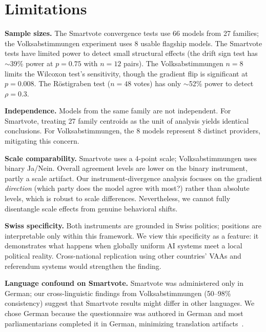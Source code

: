 \documentclass[11pt]{article}
\begin{document}
\section*{Limitations}

\textbf{Sample sizes.}
The Smartvote convergence tests use 66 models from 27 families; the Volksabstimmungen experiment uses 8 usable flagship models.
The Smartvote tests have limited power to detect small structural effects (the drift sign test has $\sim$39\% power at $p = 0.75$ with $n = 12$ pairs).
The Volksabstimmungen $n = 8$ limits the Wilcoxon test's sensitivity, though the gradient flip is significant at $p = 0.008$.
The R\"{o}stigraben test ($n = 48$ votes) has only $\sim$52\% power to detect $\rho = 0.3$.

\textbf{Independence.}
Models from the same family are not independent.
For Smartvote, treating 27 family centroids as the unit of analysis yields identical conclusions.
For Volksabstimmungen, the 8 models represent 8 distinct providers, mitigating this concern.

\textbf{Scale comparability.}
Smartvote uses a 4-point scale; Volksabstimmungen uses binary Ja/Nein.
Overall agreement levels are lower on the binary instrument, partly a scale artifact.
Our instrument-divergence analysis focuses on the gradient \emph{direction} (which party does the model agree with most?) rather than absolute levels, which is robust to scale differences.
Nevertheless, we cannot fully disentangle scale effects from genuine behavioral shifts.

\textbf{Swiss specificity.}
Both instruments are grounded in Swiss politics; positions are interpretable only within this framework.
We view this specificity as a feature: it demonstrates what happens when globally uniform AI systems meet a local political reality. Cross-national replication using other countries' VAAs and referendum systems would strengthen the finding.

\textbf{Language confound on Smartvote.}
Smartvote was administered only in German; our cross-linguistic findings from Volksabstimmungen (50--98\% consistency) suggest that Smartvote results might differ in other languages.
We chose German because the questionnaire was authored in German and most parliamentarians completed it in German, minimizing translation artifacts~\citep{exler2025large}.
\end{document}
